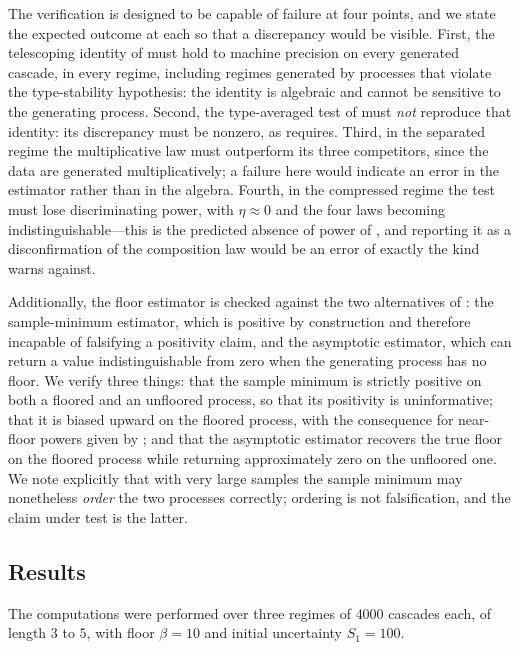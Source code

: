 \documentclass[11pt,a4paper]{article}
\theoremstyle{thmstyle}
\theoremstyle{definition}
\theoremstyle{remark}
\newcommand{\flo}{\beta}
\begin{document}
The verification is designed to be capable of failure at four points, and we
state the expected outcome at each so that a discrepancy would be visible.
First, the telescoping identity of  must hold to
machine precision on every generated cascade, in every regime, including
regimes generated by processes that violate the type-stability hypothesis:
the identity is algebraic and cannot be sensitive to the generating process.
Second, the type-averaged test of  must \emph{not} reproduce
that identity: its discrepancy must be nonzero, as 
requires. Third, in the separated regime the multiplicative law must
outperform its three competitors, since the data are generated
multiplicatively; a failure here would indicate an error in the estimator
rather than in the algebra. Fourth, in the compressed regime the test must
lose discriminating power, with $\eta\approx0$ and the four laws becoming
indistinguishable---this is the predicted absence of power of
, and reporting it as a disconfirmation of the
composition law would be an error of exactly the kind
 warns against.

Additionally, the floor estimator is checked against the two alternatives of
: the sample-minimum estimator, which is positive
by construction and therefore incapable of falsifying a positivity claim, and
the asymptotic estimator, which can return a value indistinguishable from
zero when the generating process has no floor. We verify three things: that
the sample minimum is strictly positive on both a floored and an unfloored
process, so that its positivity is uninformative; that it is biased upward on
the floored process, with the consequence for near-floor powers given by
; and that the asymptotic estimator recovers the
true floor on the floored process while returning approximately zero on the
unfloored one. We note explicitly that with very large samples the sample
minimum may nonetheless \emph{order} the two processes correctly; ordering is
not falsification, and the claim under test is the latter.




\subsection{Results}
\label{sec:results}

The computations were performed over three regimes of $4000$ cascades each,
of length $3$ to $5$, with floor $\flo=10$ and initial uncertainty $S_1=100$.
\end{document}
